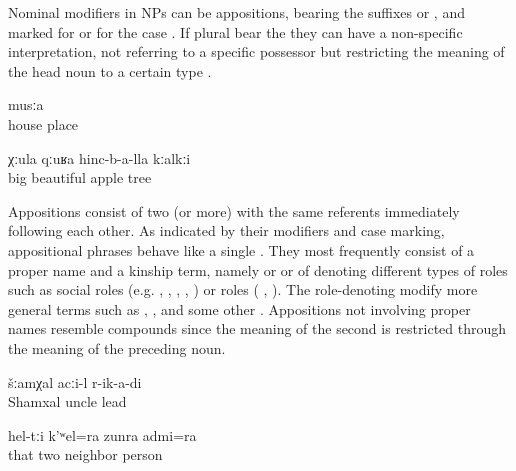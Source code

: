 Nominal modifiers in NPs can be appositions,  bearing the suffixes  or , and  marked for   or for the  case . If plural  bear the  they can have a non-specific interpretation, not referring to a specific possessor but restricting the meaning of the head noun to a certain type . 
%
\begin{exe}
		\ex	\label{ex:the place in front of his house@7a}
			musːa\\
				house	place\\
		\glt	{}
	
		\ex	\label{ex:a big beautiful apple tree@7b}
		\gll	χːula	qːuʁa	hinc-b-a-lla	kːalkːi\\
			big 	beautiful	apple	tree\\
		\glt	{}
\end{exe}

Appositions consist of two (or more)  with the same referents immediately following each other. As indicated by their modifiers and case marking, appositional phrases behave like a single . They most frequently consist of a proper name and a kinship term, namely    or   or of  denoting different types of roles such as social roles (e.g.  ,  ,  ,  ,  )  or  roles ( ,  ). The role-denoting  modify more general terms such as  ,   , and some other . Appositions not involving proper names resemble compounds  since the meaning of the second  is restricted through the meaning of the preceding noun.
%
\begin{exe}
		\ex	\label{ex:Uncle Shamkhal guided me@8a}
		\gll	šːamχal	acːi-l	r-ik-a-di\\
			Shamxal	uncle	lead\\
		\glt	{}
	
		\ex	\label{ex:and those two neighbors@8b}
		\gll	hel-tːi	k'ʷel=ra	zunra	admi=ra\\
			that	two	neighbor	person\\
		\glt	{}
	
\end{exe}


